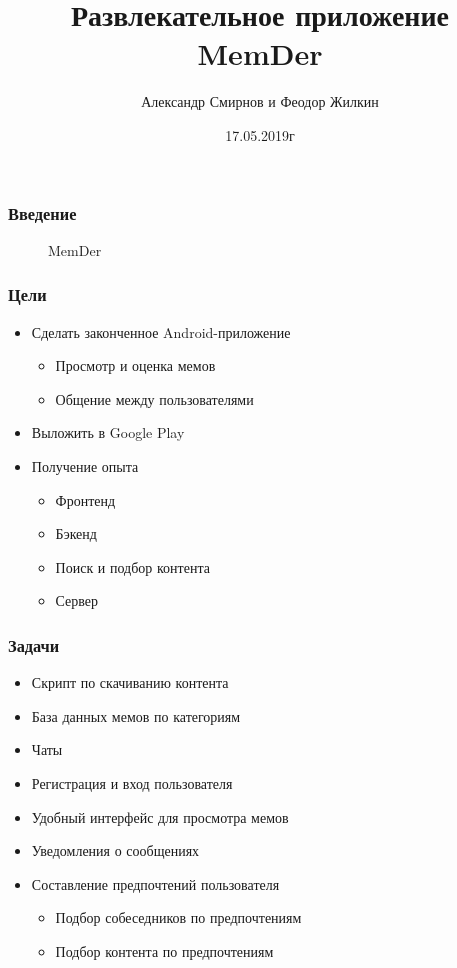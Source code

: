 \documentclass[xetex,mathserif,serif, xcolor=table]{beamer}
\title{Развлекательное приложение MemDer}
\author{Александр Смирнов и Феодор Жилкин}
\date{17.05.2019г}
\begin{document}
	\frame{\titlepage}

	\begin{frame}
		\frametitle{Введение}
		\begin{figure}[h]
            \caption{MemDer}
            \label{fig:image}
        \end{figure}
	\end{frame}
	
	\begin{frame}
		\frametitle{Цели}
			\begin{itemize}
		 		\item Сделать законченное Android-приложение
		 		    \begin{itemize}
    			    	\item Просмотр и оценка мемов
    			    	\item Общение между пользователями
    		    	\end{itemize}
		 		\item Выложить в Google Play
				\item Получение опыта
    				\begin{itemize}
    			    	\item Фронтенд
    			    	\item Бэкенд
    			    	\item Поиск и подбор контента
    			    	\item Сервер
    		    	\end{itemize}
			\end{itemize}
	\end{frame}
	
	\begin{frame}
		\frametitle{Задачи}
			\begin{itemize}
			    \item Скрипт по скачиванию контента
		 		\item База данных мемов по категориям
				\item Чаты
				\item Регистрация и вход пользователя
				\item Удобный интерфейс для просмотра мемов
				\item Уведомления о сообщениях
				\item Составление предпочтений пользователя
					\begin{itemize}
				    	\item Подбор собеседников по предпочтениям
				    	\item Подбор контента по предпочтениям
			    	\end{itemize}
			\end{itemize}
	\end{frame}	
	
\end{document}
